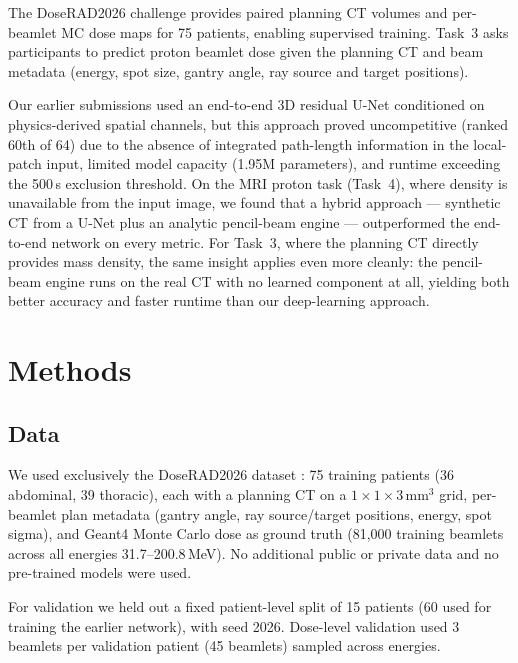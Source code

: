 \documentclass[runningheads]{llncs}
\begin{document}
The DoseRAD2026 challenge \cite{doserad_data} provides paired planning CT volumes and per-beamlet MC dose maps for 75 patients, enabling supervised training. Task~3 asks participants to predict proton beamlet dose given the planning CT and beam metadata (energy, spot size, gantry angle, ray source and target positions).

Our earlier submissions used an end-to-end 3D residual U-Net conditioned on physics-derived spatial channels, but this approach proved uncompetitive (ranked 60th of 64) due to the absence of integrated path-length information in the local-patch input, limited model capacity (1.95M parameters), and runtime exceeding the 500\,s exclusion threshold. On the MRI proton task (Task~4), where density is unavailable from the input image, we found that a hybrid approach --- synthetic CT from a U-Net plus an analytic pencil-beam engine --- outperformed the end-to-end network on every metric. For Task~3, where the planning CT directly provides mass density, the same insight applies even more cleanly: the pencil-beam engine runs on the real CT with no learned component at all, yielding both better accuracy and faster runtime than our deep-learning approach.

\section{Methods}

\subsection{Data}
We used exclusively the DoseRAD2026 dataset \cite{doserad_data}: 75 training patients (36 abdominal, 39 thoracic), each with a planning CT on a $1\times1\times3$\,mm$^3$ grid, per-beamlet plan metadata (gantry angle, ray source/target positions, energy, spot sigma), and Geant4 \cite{geant4} Monte Carlo dose as ground truth (81{,}000 training beamlets across all energies 31.7--200.8\,MeV). No additional public or private data and no pre-trained models were used.

For validation we held out a fixed patient-level split of 15 patients (60 used for training the earlier network), with seed 2026. Dose-level validation used 3 beamlets per validation patient (45 beamlets) sampled across energies.
\end{document}
